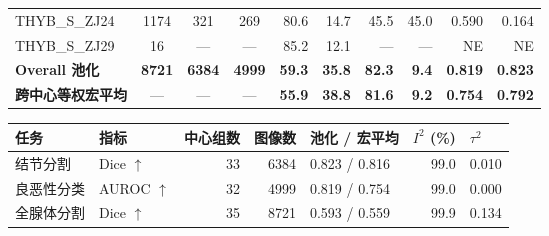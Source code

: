 \begin{responsetable}
\begin{adjustbox}{max width=\textwidth,center}
\begin{tabular}{@{}l *{3}{c} *{6}{r} @{}}
THYB\_S\_ZJ24 & 1174 & 321 & 269 & 80.6 & 14.7 & 45.5 & 45.0 & 0.590 & 0.164 \\
THYB\_S\_ZJ29 & 16 & --- & --- & 85.2 & 12.1 & --- & --- & NE & NE \\
\textbf{Overall 池化} & \textbf{8721} & \textbf{6384} & \textbf{4999} & \textbf{59.3} & \textbf{35.8} & \textbf{82.3} & \textbf{9.4} & \textbf{0.819} & \textbf{0.823} \\
\textbf{跨中心等权宏平均} & --- & --- & --- & \textbf{55.9} & \textbf{38.8} & \textbf{81.6} & \textbf{9.2} & \textbf{0.754} & \textbf{0.792} \\
\bottomrule
\end{tabular}
\end{adjustbox}
\end{responsetable}

\begin{responsetable}
\caption{}
\begin{adjustbox}{max width=\textwidth,center}
\begin{tabular}{@{}l l r r l r l@{}}
\toprule
任务 & 指标 & 中心组数 & 图像数 & 池化 / 宏平均 & $I^2$ (\%) & $\tau^2$ \\
\midrule
结节分割 & Dice $\uparrow$ & 33 & 6384 & 0.823 / 0.816 & 99.0 & 0.010 \\
良恶性分类 & AUROC $\uparrow$ & 32 & 4999 & 0.819 / 0.754 & 99.0 & 0.000 \\
全腺体分割 & Dice $\uparrow$ & 35 & 8721 & 0.593 / 0.559 & 99.9 & 0.134 \\
\bottomrule
\end{tabular}
\end{adjustbox}
\end{responsetable}
